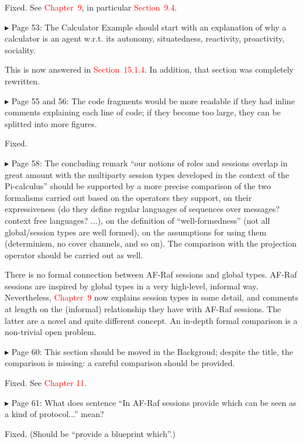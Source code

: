 \documentclass{article}
\newcommand*\R[1]{\textcolor{red}{#1}} %
\newenvironment{them}%
  {\bigskip\noindent\begingroup\color{blue}$\blacktriangleright$\enspace}%
  {\endgroup\par}
\begin{document}
Fixed.
See \R{Chapter~9},
  in particular \R{Section~9.4}.

\begin{them}
Page 53:
The Calculator Example should start with an explanation of why a calculator is
an agent w.r.t. its autonomy, situatedness, reactivity, proactivity, sociality.
\end{them}
This is now answered in \R{Section~15.1.4}.
In addition, that section was completely rewritten.


\begin{them}
Page 55 and 56:
The code fragments would be more readable if they had inline comments
explaining each line of code; if they become too large, they can be splitted
into more figures.
\end{them}
Fixed.

\begin{them}
Page 58:
The concluding remark ``our notions of roles and sessions overlap in great
amount with the multiparty session types developed in the context of the
Pi-calculus'' should be supported by a more precise comparison of the two
formalisms carried out based on the operators they support, on their
expressiveness (do they define regular languages of sequences over messages?
context free languages? ...), on the definition of ``well-formedness'' (not all
global/session types are well formed), on the assumptions for using them
(determinism, no cover channels, and so on). The comparison with the projection
operator should be carried out as well.
\end{them}

There is no formal connection between AF-Raf sessions and global types.
AF-Raf sessions are inspired by global types in a very high-level,
  informal way.
Nevertheless,
  \R{Chapter~9} now explains session types in some detail,
  and comments at length on the (informal) relationship they have with
    AF-Raf sessions.
The latter are a novel and quite different concept.
An in-depth formal comparison is a non-trivial open problem.


\begin{them}
Page 60:
This section should be moved in the Backgroud; despite the title, the
comparison is missing: a careful comparison should be provided.
\end{them}
Fixed. See \R{Chapter 11}.

\begin{them}
Page 61:
What does sentence ``In AF-Raf sessions provide which can be seen as a kind of
protocol...'' mean?
\end{them}
Fixed.
(Should be ``provide a blueprint which''.)
\end{document}
